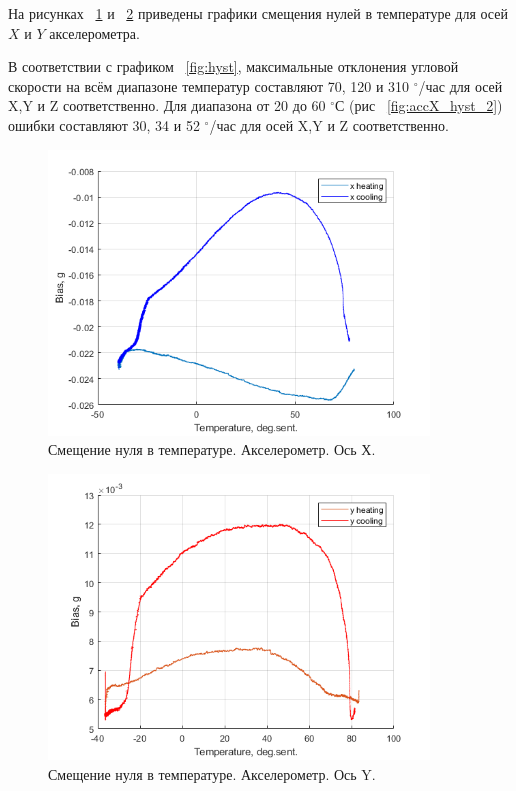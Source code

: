 \documentclass[a4paper,12pt]{article}
\begin{document}
На рисунках ~\ref{fig:accX_hyst} и ~\ref{fig:accY_hyst} приведены графики смещения нулей в температуре для осей $X$ и $Y$ акселерометра. 

В соответствии с графиком ~\ref{fig:hyst}, максимальные отклонения угловой скорости на всём диапазоне температур составляют 70, 120 и 310 $^{\circ}$/час для осей X,Y и Z соответственно. Для диапазона от 20 до 60  $^{\circ}$С (рис ~\ref{fig:accX_hyst_2}) ошибки составляют 30, 34 и 52 $^{\circ}$/час для осей X,Y и Z соответственно.
\begin{figure}[hp!]
\centering
\includegraphics[width=0.9\textwidth]{AccX_hyst.png} 
\caption{\label{fig:accX_hyst} Смещение нуля в температуре. Акселерометр. Ось Х.}
\end{figure}

\begin{figure}[hp!]
\centering
\includegraphics[width=0.9\textwidth]{AccY_hyst.png} 
\caption{\label{fig:accY_hyst}  Смещение нуля в температуре. Акселерометр. Ось Y.}
\end{figure}
\end{document}
